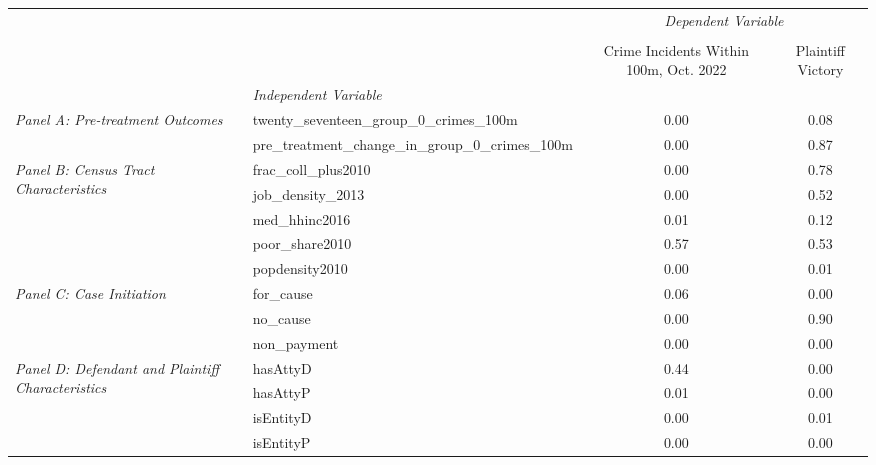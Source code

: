 \begin{tabular}{llcc}
\toprule
 &  & \multicolumn{2}{c}{\textit{Dependent Variable}} \\
\cline{3-4}
\\
 &  & Crime Incidents Within 100m, Oct. 2022 & Plaintiff Victory \\
 & \emph{Independent Variable} &  &  \\
\midrule
\multirow[c]{2}{3cm}{\textit{Panel A: Pre-treatment Outcomes}} & twenty_seventeen_group_0_crimes_100m & 0.00 & 0.08 \\
 & pre_treatment_change_in_group_0_crimes_100m & 0.00 & 0.87 \\
\cline{1-4}
\multirow[c]{5}{3cm}{\textit{Panel B: Census Tract Characteristics}} & frac_coll_plus2010 & 0.00 & 0.78 \\
 & job_density_2013 & 0.00 & 0.52 \\
 & med_hhinc2016 & 0.01 & 0.12 \\
 & poor_share2010 & 0.57 & 0.53 \\
 & popdensity2010 & 0.00 & 0.01 \\
\cline{1-4}
\multirow[c]{3}{3cm}{\textit{Panel C: Case Initiation}} & for_cause & 0.06 & 0.00 \\
 & no_cause & 0.00 & 0.90 \\
 & non_payment & 0.00 & 0.00 \\
\cline{1-4}
\multirow[c]{4}{3cm}{\textit{Panel D: Defendant and Plaintiff Characteristics}} & hasAttyD & 0.44 & 0.00 \\
 & hasAttyP & 0.01 & 0.00 \\
 & isEntityD & 0.00 & 0.01 \\
 & isEntityP & 0.00 & 0.00 \\
\cline{1-4}
\bottomrule
\end{tabular}
